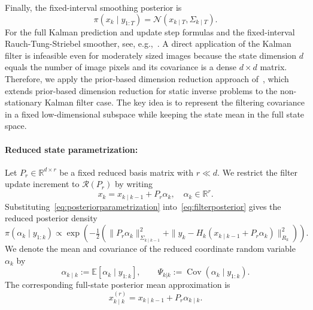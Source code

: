 \documentclass[a4paper,12pt]{article}
\begin{document}
Finally, the fixed-interval smoothing posterior is
\begin{equation}
    \pi(x_k \mid y_{1:T}) = \mathcal{N}(x_{k \mid T}, \Sigma_{k \mid T}).
\end{equation}
For the full Kalman prediction and update step formulas and the fixed-interval Rauch-Tung-Striebel smoother, see, e.g.,~\cite{kaipiosomersalo,sarkka}.
A direct application of the Kalman filter is infeasible even for moderately sized images because the state dimension $d$ equals the number of image pixels and its covariance is a dense $d \times d$ matrix.
Therefore, we apply the prior-based dimension reduction approach of~\cite{solonen}, which extends prior-based dimension reduction for static inverse problems to the non-stationary Kalman filter case.
The key idea is to represent the filtering covariance in a fixed low-dimensional subspace while keeping the state mean in the full state space.

\paragraph{Reduced state parametrization:}
Let $P_r \in \mathbb{R}^{d \times r}$ be a fixed reduced basis matrix with $r \ll d$.
We restrict the filter update increment to $\mathcal{R}(P_r)$ by writing
\begin{equation}
    x_{k} = x_{k \mid k-1} + P_r \alpha_{k}, \quad \alpha_{k} \in \mathbb{R}^r.\label{eq:posteriorparametrization}
\end{equation}
Substituting~\eqref{eq:posteriorparametrization} into~\eqref{eq:filterposterior} gives the reduced posterior density
\begin{equation}
    \pi(\alpha_{k} \mid y_{1:k})
    \propto \exp\!\left(- \tfrac{1}{2} \left(
    \| P_r \alpha_{k} \|_{\Sigma_{k \mid k-1}}^2
    + \| y_k - H_k (x_{k \mid k-1} + P_r \alpha_{k}) \|_{R_k}^{2}
    \right) \right). \label{eq:reducedfilterposterior}
\end{equation}
We denote the mean and covariance of the reduced coordinate random variable $\alpha_k$ by
\begin{equation}
    \alpha_{k \mid k} := \mathbb{E}[\alpha_k \mid y_{1:k}], \qquad
    \Psi_{k|k} := \operatorname{Cov}(\alpha_k \mid y_{1:k}).
\end{equation}
The corresponding full-state posterior mean approximation is
\begin{equation}
    x_{k \mid k}^{(r)} = x_{k \mid k-1} + P_r \alpha_{k \mid k}.
\end{equation}
\end{document}
